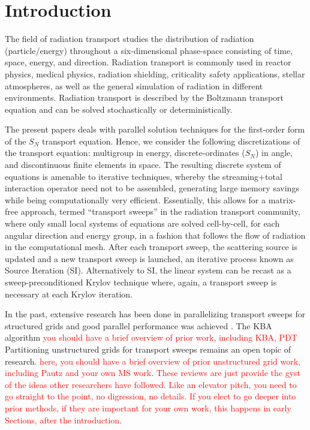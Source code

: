 \documentclass[times,final]{elsarticle}
\newcommand{\tcr}[1]{\textcolor{red}{#1}}
\begin{document}
\section{Introduction}

The field of radiation transport studies the distribution of radiation (particle/energy) throughout a six-dimensional phase-space consisting of time, space, energy, and direction. 
Radiation transport is commonly used in reactor physics, medical physics, radiation shielding, criticality safety applications, stellar atmospheres, as well as the general simulation of radiation in different environments. 
Radiation transport is described by the Boltzmann transport equation \cite{bell_glasstone,zweifel,davison,duderstadt} and can be solved stochastically or deterministically.

The present papers deals with parallel solution techniques for the first-order form  of the $S_N$ transport equation. Hence, we consider the following discretizations of the transport equation: multigroup in energy, discrete-ordinates ($S_N$) in angle, and discontinuous finite elements in space. 
The resulting discrete system of equations is amenable to iterative techniques, whereby the streaming+total interaction operator need not to be assembled, generating large memory savings while being computationally very efficient.  
Essentially, this allows for a matrix-free approach, termed ``transport sweeps'' in the radiation transport community, where only small local systems of equations are solved cell-by-cell, for each angular direction and energy group, in a fashion that follows the flow of radiation in the computational mesh.
After each transport sweep, the scattering source is updated and a new transport sweep is launched, an iterative process known as Source Iteration (SI).
Alternatively to SI, the linear system can be recast as a sweep-preconditioned Krylov technique where, again, a transport sweep is necessary at each Krylov iteration.

In the past, extensive research has been done in parallelizing transport sweeps for structured grids and good parallel performance was achieved \cite{KBA,partisn,denovo,mpadams2013,mpadams2015,mpadamsjcp}.
The KBA algorithm \cite{KBA}  \cite{mpadams2013,mpadams2015,mpadamsjcp} 
\tcr{you should have a brief overview of prior work, including KBA, PDT}
Partitioning unstructured grids for transport sweeps remains an open topic of research. \tcr{here, you should have a brief overview of prior unstructured grid work, including Pautz and your own MS work}. \tcr{These reviews are just provide the gyst of the ideas other researchers have followed. Like an elevator pitch, you need to go straight to the point, no digression, no details. If you elect to go deeper into prior methods, if they are important for your own work, this happens in early Sections, after the introduction}.
\end{document}
